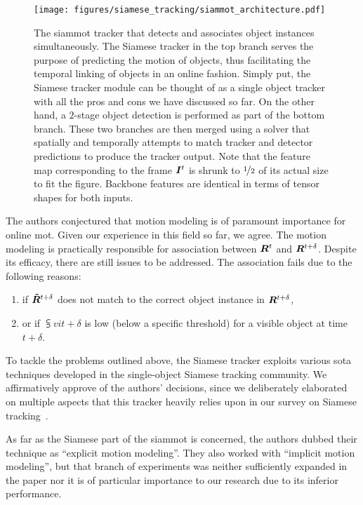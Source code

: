 \begin{figure}[t]
    \centering
    \texttt{[image: figures/siamese\_tracking/siammot\_architecture.pdf]}
    \caption[\gls{siammot} architecture]{The \gls{siammot} tracker that detects and associates object instances simultaneously. The Siamese tracker in the top branch serves the purpose of predicting the motion of objects, thus facilitating the temporal linking of objects in an online fashion. Simply put, the Siamese tracker module can be thought of as a single object tracker with all the pros and cons we have discussed so far. On the other hand, a $2$-stage object detection is performed as part of the bottom branch. These two branches are then merged using a solver that spatially and temporally attempts to match tracker and detector predictions to produce the tracker output. Note that the feature map corresponding to the frame $\bm{I}^{t}$ is shrunk to $\nicefrac{1}{2}$ of its actual size to fit the figure. Backbone features are identical in terms of tensor shapes for both inputs. }
    \label{fig:SiamMOTArchitecture}
\end{figure}

The authors conjectured that motion modeling is of paramount importance for online \gls{mot}. Given our experience in this field so far, we agree. The motion modeling is practically responsible for association between $\bm{R}^{t}$ and $\bm{R}^{t + \delta}$. Despite its efficacy, there are still issues to be addressed. The association fails due to the following reasons:
\begin{enumerate}
    \item if $\bm{\tilde{R}}^{t + \delta}$ does not match to the correct object instance in $\bm{R}^{t + \delta}$,
    \item or if $\subsup{v}{i}{t + \delta}$ is low (below a specific threshold) for a visible object at time $t + \delta$.
\end{enumerate}
To tackle the problems outlined above, the Siamese tracker exploits various \gls{sota} techniques developed in the single-object Siamese tracking community. We affirmatively approve of the authors' decisions, since we deliberately elaborated on multiple aspects that this tracker heavily relies upon in our survey on Siamese tracking~\cite{ondrasovic2021siamese}.

As far as the Siamese part of the \gls{siammot} is concerned, the authors dubbed their technique as ``explicit motion modeling''. They also worked with ``implicit motion modeling'', but that branch of experiments was neither sufficiently expanded in the paper nor it is of particular importance to our research due to its inferior performance.


